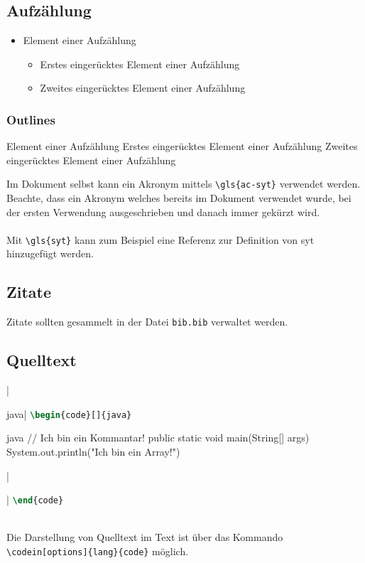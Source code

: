 \newpage
\subsection{Aufzählung}
\begin{itemize}
	\item Element einer Aufzählung
	\begin{itemize}
        \item Erstes eingerücktes Element einer Aufzählung
        \item Zweites eingerücktes Element einer Aufzählung
    \end{itemize}
\end{itemize}

\subsubsection{Outlines}
\begin{outline}
    \1 Element einer Aufzählung
        \2 Erstes eingerücktes Element einer Aufzählung
        \2 Zweites eingerücktes Element einer Aufzählung
\end{outline}

Im Dokument selbst kann ein Akronym mittels \verb|\gls{ac-syt}| verwendet werden. Beachte, dass ein Akronym welches bereits im Dokument verwendet wurde, bei der ersten Verwendung ausgeschrieben und danach immer gekürzt wird.
\\\\
Mit \verb|\gls{syt}| kann zum Beispiel eine Referenz zur Definition von \gls{syt} hinzugefügt werden.

\subsection{Zitate}
Zitate sollten gesammelt in der Datei \texttt{bib.bib} verwaltet werden.

\newpage
\subsection{Quelltext}
\begin{listing}
\ifminted   {}|\begin{code}[]{java}|    %
\else       \lstinline[numbers=left, language=tex]$\begin{code}[]{java}$\fi
\begin{code}[firstnumber=last]{java}
// Ich bin ein Kommantar!
public static void main(String[] args) {
    System.out.println("Ich bin ein Array!")
}
\end{code}
\ifminted   {}|\end{code}|    %
\else       \lstinline[firstnumber=last, numbers=left, language=tex]$\end{code}$\fi

\caption{Java Code}
\label{lst:java-code}
\end{listing}
~\\
Die Darstellung von Quelltext im Text ist über das Kommando \verb|\codein[options]{lang}{code}| möglich.

